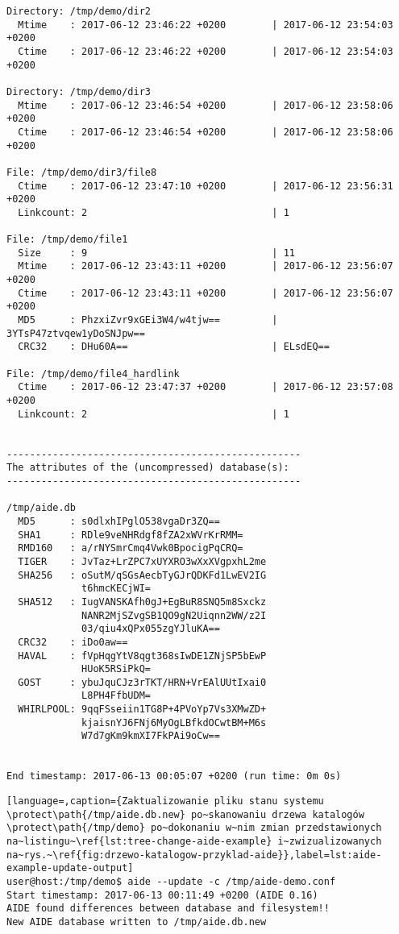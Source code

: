 \documentclass[thesis]{subfiles}
\begin{document}
\begin{appendices}
\begin{lstlisting}
Directory: /tmp/demo/dir2
  Mtime    : 2017-06-12 23:46:22 +0200        | 2017-06-12 23:54:03 +0200
  Ctime    : 2017-06-12 23:46:22 +0200        | 2017-06-12 23:54:03 +0200

Directory: /tmp/demo/dir3
  Mtime    : 2017-06-12 23:46:54 +0200        | 2017-06-12 23:58:06 +0200
  Ctime    : 2017-06-12 23:46:54 +0200        | 2017-06-12 23:58:06 +0200

File: /tmp/demo/dir3/file8
  Ctime    : 2017-06-12 23:47:10 +0200        | 2017-06-12 23:56:31 +0200
  Linkcount: 2                                | 1

File: /tmp/demo/file1
  Size     : 9                                | 11
  Mtime    : 2017-06-12 23:43:11 +0200        | 2017-06-12 23:56:07 +0200
  Ctime    : 2017-06-12 23:43:11 +0200        | 2017-06-12 23:56:07 +0200
  MD5      : PhzxiZvr9xGEi3W4/w4tjw==         | 3YTsP47ztvqew1yDoSNJpw==
  CRC32    : DHu60A==                         | ELsdEQ==

File: /tmp/demo/file4_hardlink
  Ctime    : 2017-06-12 23:47:37 +0200        | 2017-06-12 23:57:08 +0200
  Linkcount: 2                                | 1


---------------------------------------------------
The attributes of the (uncompressed) database(s):
---------------------------------------------------

/tmp/aide.db
  MD5      : s0dlxhIPglO538vgaDr3ZQ==
  SHA1     : RDle9veNHRdgf8fZA2xWVrKrRMM=
  RMD160   : a/rNYSmrCmq4Vwk0BpocigPqCRQ=
  TIGER    : JvTaz+LrZPC7xUYXRO3wXxXVgpxhL2me
  SHA256   : oSutM/qSGsAecbTyGJrQDKFd1LwEV2IG
             t6hmcKECjWI=
  SHA512   : IugVANSKAfh0gJ+EgBuR8SNQ5m8Sxckz
             NANR2MjSZvgSB1QO9gN2Uiqnn2WW/z2I
             03/qiu4xQPx055zgYJluKA==
  CRC32    : iDo0aw==
  HAVAL    : fVpHqgYtV8qgt368sIwDE1ZNjSP5bEwP
             HUoK5RSiPkQ=
  GOST     : ybuJquCJz3rTKT/HRN+VrEAlUUtIxai0
             L8PH4FfbUDM=
  WHIRLPOOL: 9qqFSseiin1TG8P+4PVoYp7Vs3XMwZD+
             kjaisnYJ6FNj6MyOgLBfkdOCwtBM+M6s
             W7d7gKm9kmXI7FkPAi9oCw==


End timestamp: 2017-06-13 00:05:07 +0200 (run time: 0m 0s)
\end{lstlisting}
\label{aide-example-second-scan-last-page} %

\begin{lstlisting}[language=,caption={Zaktualizowanie pliku stanu systemu \protect\path{/tmp/aide.db.new} po~skanowaniu drzewa katalogów \protect\path{/tmp/demo} po~dokonaniu w~nim zmian przedstawionych na~listingu~\ref{lst:tree-change-aide-example} i~zwizualizowanych na~rys.~\ref{fig:drzewo-katalogow-przyklad-aide}},label=lst:aide-example-update-output]
user@host:/tmp/demo$ aide --update -c /tmp/aide-demo.conf 
Start timestamp: 2017-06-13 00:11:49 +0200 (AIDE 0.16)
AIDE found differences between database and filesystem!!
New AIDE database written to /tmp/aide.db.new


\end{lstlisting}
\end{appendices}
\end{document}
